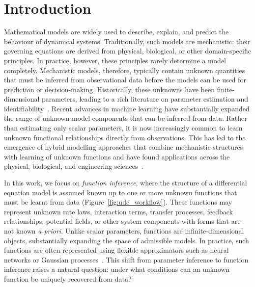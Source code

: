 \documentclass{article}
\theoremstyle{plain}
\theoremstyle{definition}
\begin{document}
\section{Introduction}

Mathematical models are widely used to describe, explain, and predict the behaviour of dynamical systems. Traditionally, such models are mechanistic: their governing equations are derived from physical, biological, or other domain-specific principles. In practice, however, these principles rarely determine a model completely. Mechanistic models, therefore, typically contain unknown quantities that must be inferred from observational data before the models can be used for prediction or decision-making. Historically, these unknowns have been finite-dimensional parameters, leading to a rich literature on parameter estimation and identifiability~\cite{bellman_structural_1970,raue_structural_2009,Chis_struct_ident_2011,villaverde_protocol_2022,simpson_parameter_2026}. Recent advances in machine learning have substantially expanded the range of unknown model components that can be inferred from data. Rather than estimating only scalar parameters, it is now increasingly common to learn unknown functional relationships directly from observations. This has led to the emergence of hybrid modelling approaches that combine mechanistic structures with learning of unknown functions and have found applications across the physical, biological, and engineering sciences~\cite{alber_integrating_2019,noordijk_rise_2024,willard_integrating_2022}.

In this work, we focus on \emph{function inference}, where the structure of a differential equation model is assumed known up to one or more unknown functions that must be learnt from data (Figure~\ref{fig:ude_workflow}). These functions may represent unknown rate laws, interaction terms, transfer processes, feedback relationships, potential fields, or other system components with forms that are not known \textit{a priori}. Unlike scalar parameters, functions are infinite-dimensional objects, substantially expanding the space of admissible models. In practice, such functions are often represented using flexible approximators such as neural networks or Gaussian processes~\cite{rackauckas_universal_2021,raissi_physics-informed_2019,karniadakis_physics-informed_2021,dandekar_bayesian_2022}. This shift from parameter inference to function inference raises a natural question: under what conditions can an unknown function be uniquely recovered from data?
\end{document}

